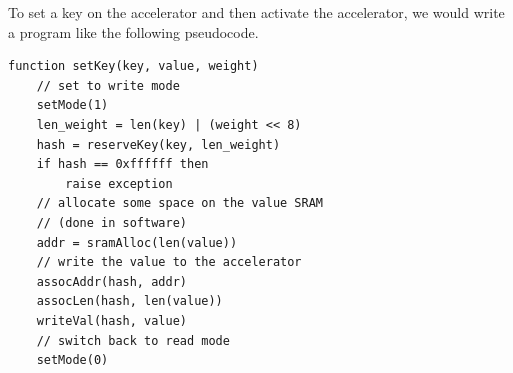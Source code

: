 To set a key on the accelerator and then activate the accelerator, we would
write a program like the following pseudocode.

{\footnotesize
\begin{verbatim}
function setKey(key, value, weight)
    // set to write mode
    setMode(1)
    len_weight = len(key) | (weight << 8)
    hash = reserveKey(key, len_weight)
    if hash == 0xffffff then
        raise exception
    // allocate some space on the value SRAM
    // (done in software)
    addr = sramAlloc(len(value))
    // write the value to the accelerator
    assocAddr(hash, addr)
    assocLen(hash, len(value))
    writeVal(hash, value)
    // switch back to read mode
    setMode(0)
\end{verbatim}
}
